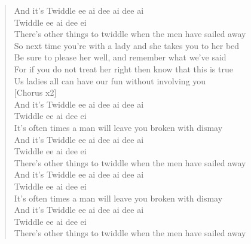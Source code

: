 \documentclass[11pt]{article}
\begin{document}
\begin{verse}
And it's Twiddle ee ai dee ai dee ai\\
Twiddle ee ai dee ei\\
There's other things to twiddle when the men have sailed away\\
So next time you're with a lady and she takes you to her bed\\
Be sure to please her well, and remember what we've said\\
For if you do not treat her right then know that this is true\\
Us ladies all can have our fun without involving you\\
\vspace*{1em}
[Chorus x2]\\
And it's Twiddle ee ai dee ai dee ai\\
Twiddle ee ai dee ei\\
It's often times a man will leave you broken with dismay\\
And it's Twiddle ee ai dee ai dee ai\\
Twiddle ee ai dee ei\\
There's other things to twiddle when the men have sailed away\\
And it's Twiddle ee ai dee ai dee ai\\
Twiddle ee ai dee ei\\
It's often times a man will leave you broken with dismay\\
And it's Twiddle ee ai dee ai dee ai\\
Twiddle ee ai dee ei\\
There's other things to twiddle when the men have sailed away\\
\end{verse}
\clearpage
\end{document}
